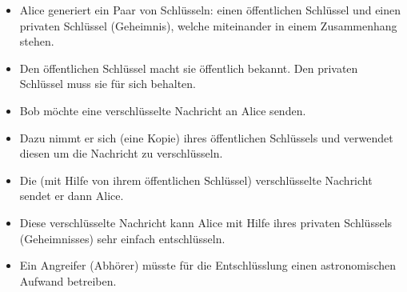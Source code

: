%
%

\begin{frame}[fragile]
	\begin{itemize}
		\item Alice generiert ein Paar von Schlüsseln: einen öffentlichen Schlüssel und einen privaten Schlüssel (Geheimnis), welche miteinander in einem Zusammenhang stehen.
		\item Den öffentlichen Schlüssel macht sie öffentlich bekannt. Den privaten Schlüssel muss sie für sich behalten.
	\end{itemize}
\end{frame}

\begin{frame}[fragile]
	\begin{itemize}
		\item Bob möchte eine verschlüsselte Nachricht an Alice senden.
		\item Dazu nimmt er sich (eine Kopie) ihres öffentlichen Schlüssels und verwendet diesen um die Nachricht zu verschlüsseln.
		\item Die (mit Hilfe von ihrem öffentlichen Schlüssel) verschlüsselte Nachricht sendet er dann Alice.
		\item Diese verschlüsselte Nachricht kann Alice mit Hilfe ihres privaten Schlüssels (Geheimnisses) sehr einfach entschlüsseln.
		\item Ein Angreifer (Abhörer) müsste für die Entschlüsslung einen astronomischen Aufwand betreiben.
	\end{itemize}
\end{frame}

